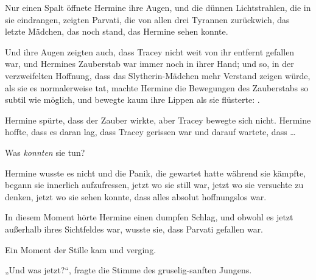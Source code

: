 Nur einen Spalt öffnete Hermine ihre Augen, und die dünnen Lichtstrahlen, die in sie eindrangen, zeigten Parvati, die von allen drei Tyrannen zurückwich, das letzte Mädchen, das noch stand, das Hermine sehen konnte.

Und ihre Augen zeigten auch, dass Tracey nicht weit von ihr entfernt gefallen war, und Hermines Zauberstab war immer noch in ihrer Hand; und so, in der verzweifelten Hoffnung, dass das Slytherin-Mädchen mehr Verstand zeigen würde, als sie es normalerweise tat, machte Hermine die Bewegungen des Zauberstabs so subtil wie möglich, und bewegte kaum ihre Lippen als sie flüsterte: .

Hermine spürte, dass der Zauber wirkte, aber Tracey bewegte sich nicht. Hermine hoffte, dass es daran lag, dass Tracey gerissen war und darauf wartete, dass …

Was \emph{konnten} sie tun?

Hermine wusste es nicht und die Panik, die gewartet hatte während sie kämpfte, begann sie innerlich aufzufressen, jetzt wo sie still war, jetzt wo sie versuchte zu denken, jetzt wo sie sehen konnte, dass alles absolut hoffnungslos war.

In diesem Moment hörte Hermine einen dumpfen Schlag, und obwohl es jetzt außerhalb ihres Sichtfeldes war, wusste sie, dass Parvati gefallen war.

Ein Moment der Stille kam und verging.

„Und was jetzt?“, fragte die Stimme des gruselig-sanften Jungens.

